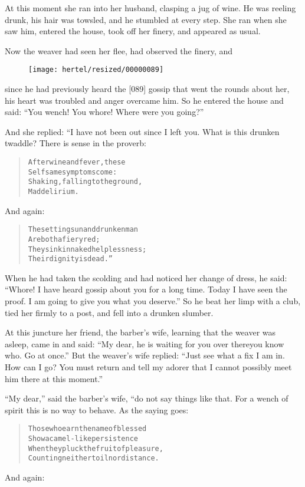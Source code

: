 \documentclass[article, twoside, 10pt]{memoir}
\renewenvironment{verbatim}{%
\begin{quote}%
\vskip -10pt%
\begin{alltt}\normalfont\small}{\end{alltt}%
\end{quote}%
\vskip -10pt
} %
\begin{document}
At this moment she ran into her husband, clasping a jug of wine. He
was reeling drunk, his hair was towsled, and he stumbled at every
step. She ran when she saw him, entered the house, took off her
finery, and appeared as usual.

Now the weaver had seen her flee, had observed the finery, and
\begin{figure}[p]\texttt{[image: hertel/resized/00000089]}\end{figure}since he had previously heard the [089] gossip that went the rounds
about her, his heart was troubled and anger overcame him. So he
entered the house and said:
``You wench! You whore! Where were you going?''

And she replied: “I have not been out since I left you. What is
this drunken twaddle? There is sense in the proverb:

\begin{verbatim}
After wine and fever, these
    Selfsame symptoms come:
Shaking, falling to the ground,
    Mad delirium.
\end{verbatim}
And again:

\begin{verbatim}
The setting sun and drunken man
    Are both a fiery red;
They sink in naked helplessness;
    Their dignity is dead.”
\end{verbatim}
When he had taken the scolding and had noticed her change of dress,
he said:
``Whore! I have heard gossip about you for a long time. Today I have seen the proof. I am going to give you what you deserve.''
So he beat her limp with a club, tied her firmly to a post, and
fell into a drunken slumber.

At this juncture her friend, the barber's wife, learning that the
weaver was asleep, came in and said:
``My dear, he is waiting for you over there{\textemdash}you know who. Go at once.''
But the weaver's wife replied:
``Just see what a fix I am in. How can I go? You must return and tell my adorer that I cannot possibly meet him there at this moment.''

``My dear,'' said the barber's wife, “do not say things like that.
For a wench of spirit this is no way to behave. As the saying
goes:

\begin{verbatim}
Those who earn the name of blessed
    Show a camel-like persistence
When they pluck the fruit of pleasure,
    Counting neither toil nor distance.
\end{verbatim}
And again:
\end{document}
